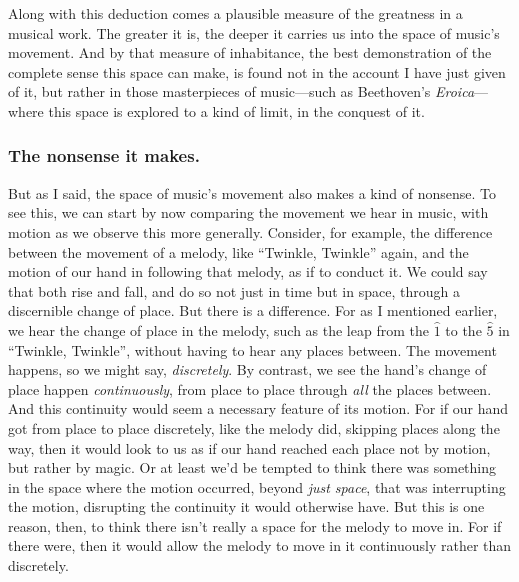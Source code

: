 \documentclass[12pt]{memoir}
\begin{document}
Along with this deduction comes a plausible
measure of the greatness in a musical work.
The greater it is, the deeper it carries us into
the space of music's movement. And by that measure
of inhabitance, the best demonstration of the
complete sense this space can make, is found not
in the account I have just given of it, but rather
in those masterpieces of music---such as
Beethoven's \emph{Eroica}---where this space is
explored to a kind of limit, in the conquest of
it.

\subsubsection{The nonsense it makes.} But as I
said, the space of music's movement also makes a
kind of nonsense. To see this, we can start by now
comparing the movement we hear in music, with
motion as we observe this more generally.
Consider, for example, the difference between the
movement of a melody, like ``Twinkle, Twinkle''
again, and the motion of our hand in following
that melody, as if to conduct it. We could say
that both rise and fall, and do so not just in
time but in space, through a discernible change of
place. But there is a difference.  For as I
mentioned earlier, we hear the change of place in
the melody, such as the leap from the $\hat{1}$ to
the $\hat{5}$ in ``Twinkle, Twinkle'', without
having to hear any places between. The movement
happens, so we might say, \emph{discretely}. By
contrast, we see the hand's change of place happen
\emph{continuously}, from place to place through
\emph{all} the places between. And this continuity
would seem a necessary feature of its motion. For
if our hand got from place to place discretely,
like the melody did, skipping places along the
way, then it would look to us as if our hand
reached each place not by motion, but rather by
magic.  Or at least we'd be tempted to think there
was something in the space where the motion
occurred, beyond \emph{just space}, that was
interrupting the motion, disrupting the continuity
it would otherwise have. But this is one reason,
then, to think there isn't really a space for the
melody to move in. For if there were, then it
would allow the melody to move in it continuously
rather than discretely.
\end{document}

